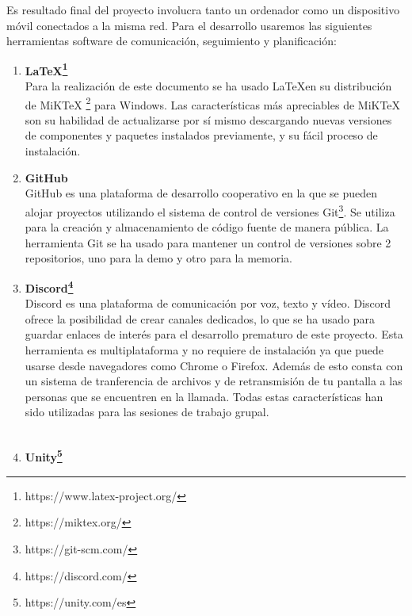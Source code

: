 Es resultado final del proyecto involucra tanto un ordenador como un dispositivo m\'ovil conectados a la misma red. Para el desarrollo usaremos las siguientes herramientas software de comunicaci\'on, seguimiento y planificaci\'on:

\begin{enumerate}

\item \textbf{\LaTeX \footnote{https://www.latex-project.org/}}\\

Para la realizaci\'on de este documento se ha usado \LaTeX en su distribuci\'on de MiKTeX \footnote{https://miktex.org/} para Windows.
Las caracter\'isticas m\'as apreciables de MiKTeX son su habilidad de actualizarse por s\'i mismo descargando nuevas versiones de componentes y paquetes instalados previamente, y su f\'acil proceso de instalaci\'on.\\

\item \textbf{GitHub}\\

 GitHub es una plataforma de desarrollo cooperativo en la que se pueden alojar proyectos utilizando el sistema de control de versiones Git\footnote{https://git-scm.com/}. Se utiliza para la creaci\'on y almacenamiento de c\'odigo fuente de manera p\'ublica. La herramienta Git se ha usado para mantener un control de versiones sobre 2 repositorios, uno para la demo y otro para la memoria. \\

\item \textbf{Discord\footnote{https://discord.com/}}\\

Discord es una plataforma de comunicaci\'on por voz, texto y v\'ideo. Discord ofrece la posibilidad de crear canales dedicados, lo que se ha usado para guardar enlaces de inter\'es para el desarrollo prematuro de este proyecto. 
Esta herramienta es multiplataforma y no requiere de instalaci\'on ya que puede usarse desde navegadores como Chrome o Firefox. Adem\'as de esto consta con un sistema de tranferencia de archivos y de retransmisi\'on de tu pantalla a las personas que se encuentren en la llamada. Todas estas caracter\'isticas han sido utilizadas para las sesiones de trabajo grupal. \\
\\

\item \textbf{Unity\footnote{https://unity.com/es}}\\


\end{enumerate}
